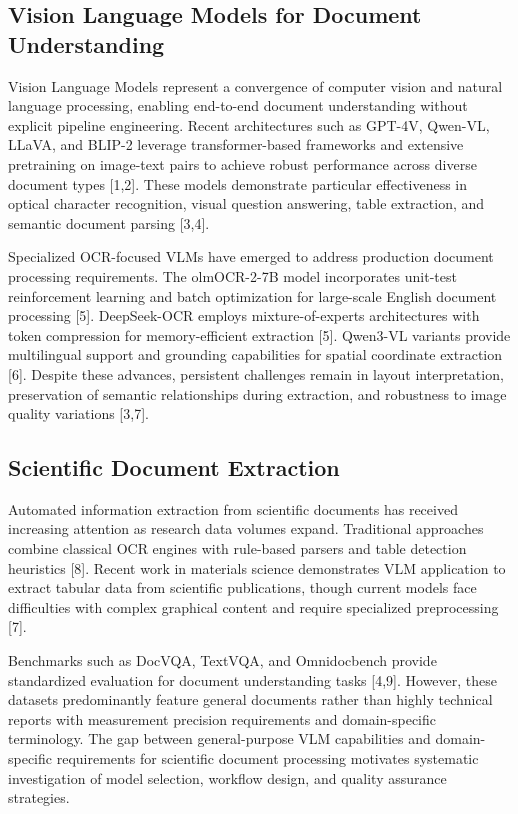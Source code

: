\documentclass{svproc}
\begin{document}
\subsection{Vision Language Models for Document Understanding}

Vision Language Models represent a convergence of computer vision and natural language processing, enabling end-to-end document understanding without explicit pipeline engineering. Recent architectures such as GPT-4V, Qwen-VL, LLaVA, and BLIP-2 leverage transformer-based frameworks and extensive pretraining on image-text pairs to achieve robust performance across diverse document types [1,2]. These models demonstrate particular effectiveness in optical character recognition, visual question answering, table extraction, and semantic document parsing [3,4].

Specialized OCR-focused VLMs have emerged to address production document processing requirements. The olmOCR-2-7B model incorporates unit-test reinforcement learning and batch optimization for large-scale English document processing [5]. DeepSeek-OCR employs mixture-of-experts architectures with token compression for memory-efficient extraction [5]. Qwen3-VL variants provide multilingual support and grounding capabilities for spatial coordinate extraction [6]. Despite these advances, persistent challenges remain in layout interpretation, preservation of semantic relationships during extraction, and robustness to image quality variations [3,7].

\subsection{Scientific Document Extraction}

Automated information extraction from scientific documents has received increasing attention as research data volumes expand. Traditional approaches combine classical OCR engines with rule-based parsers and table detection heuristics [8]. Recent work in materials science demonstrates VLM application to extract tabular data from scientific publications, though current models face difficulties with complex graphical content and require specialized preprocessing [7].

Benchmarks such as DocVQA, TextVQA, and Omnidocbench provide standardized evaluation for document understanding tasks [4,9]. However, these datasets predominantly feature general documents rather than highly technical reports with measurement precision requirements and domain-specific terminology. The gap between general-purpose VLM capabilities and domain-specific requirements for scientific document processing motivates systematic investigation of model selection, workflow design, and quality assurance strategies.
\end{document}
